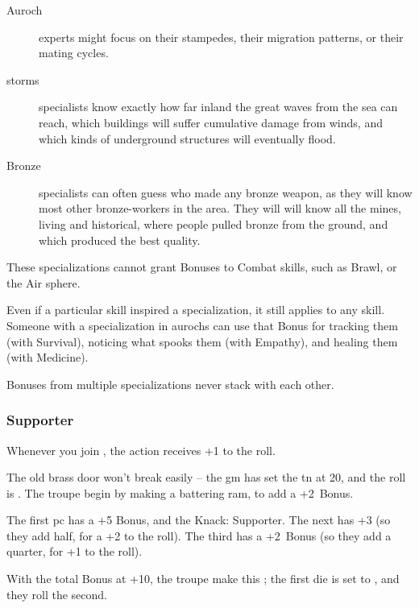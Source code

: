 \begin{multicols}{2}
\begin{description}
  \item[Auroch]
  experts might focus on their stampedes, their migration patterns, or their mating cycles.
  \item[\Glspl{storm}]
  specialists know exactly how far inland the great waves from the sea can reach, which buildings will suffer cumulative damage from winds, and which kinds of underground structures will eventually flood.
  \item[Bronze]
  specialists can often guess who made any bronze weapon, as they will know most other bronze-workers in the area.
  They will will know all the mines, living and historical, where people pulled bronze from the ground, and which produced the best quality.
\end{description}

These specializations cannot grant Bonuses to Combat \glspl{skill}, such as Brawl, or the Air \gls{sphere}.

Even if a particular skill inspired a specialization, it still applies to any skill.
Someone with a specialization in aurochs can use that Bonus for tracking them (with Survival), noticing what spooks them (with Empathy), and healing them (with Medicine).

Bonuses from multiple specializations never stack with each other.

\subsubsection{Supporter}
Whenever you join , the action receives +1 to the roll.

\begin{exampletext}
  The old brass door won't break easily -- the \gls{gm} has set the \gls{tn} at 20, and the roll is .
  The troupe begin by making a battering ram, to add a +2~Bonus.

  The first \gls{pc} has a +5 Bonus, and the Knack: Supporter.
  The next has +3 (so they add half, for a +2 to the roll).
  The third has a +2~Bonus (so they add a quarter, for +1 to the roll).

  With the total Bonus at +10, the troupe make this ; the first die is set to , and they roll the second.
\end{exampletext}

\end{multicols}
